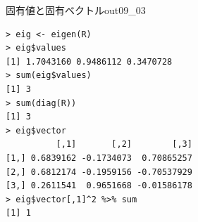 \begin{Rscreen}{固有値と固有ベクトル}{out09_03}
	\begin{verbatim}
> eig <- eigen(R)
> eig$values
[1] 1.7043160 0.9486112 0.3470728
> sum(eig$values)
[1] 3
> sum(diag(R))
[1] 3
> eig$vector
          [,1]       [,2]        [,3]
[1,] 0.6839162 -0.1734073  0.70865257
[2,] 0.6812174 -0.1959156 -0.70537929
[3,] 0.2611541  0.9651668 -0.01586178
> eig$vector[,1]^2 %>% sum
[1] 1
\end{verbatim}
\end{Rscreen}
